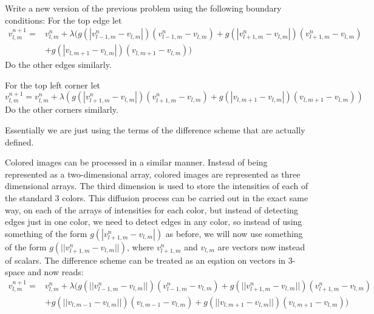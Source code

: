 \begin{problem}
Write a new version of the previous problem using the following boundary conditions:
For the top edge let 
\begin{equation*}
\begin{split}
v_{l,m}^{n+1} =& v_{l,m}^n + \lambda (g(|v_{l-1,m}^n - v_{l,m}|)(v_{l-1,m}^n - v_{l,m}) + g(|v_{l+1,m}^n - v_{l,m}|)(v_{l+1,m}^n - v_{l,m}) \\
 &+ g(|v_{l,m+1} - v_{l,m}|)(v_{l,m+1} - v_{l,m}))
\end{split}
\end{equation*}
Do the other edges similarly.

For the top left corner let
\begin{equation*}
v_{l,m}^{n+1} = v_{l,m}^n + \lambda (g(|v_{l+1,m}^n - v_{l,m}|)(v_{l+1,m}^n - v_{l,m}) + g(|v_{l,m+1} - v_{l,m}|)(v_{l,m+1} - v_{l,m}))
\end{equation*}
Do the other corners similarly.

Essentially we are just using the terms of the difference scheme that are actually defined.
\end{problem}

Colored images can be processed in a similar manner.
Instead of being represented as a two-dimensional array, colored images are represented as three dimensional arrays.
The third dimension is used to store the intensities of each of the standard 3 colors.
This diffusion process can be carried out in the exact same way, on each of the arrays of intensities for each color, but instead of detecting edges just in one color, we need to detect edges in any color, so instead of using something of the form $g(|v_{l+1,m}^n - v_{l,m}|)$ as before, we will now use something of the form $g(||v_{l+1,m}^n - v_{l,m}||)$, where $v_{l+1,m}^n$ and $v_{l,m}$ are vectors now instead of scalars.
The difference scheme can be treated as an eqation on vectors in 3-space and now reads:
\begin{equation*}
\begin{split}
v_{l,m}^{n+1} =& v_{l,m}^n + \lambda (g(||v_{l-1,m}^n - v_{l,m}||)(v_{l-1,m}^n - v_{l,m}) + g(||v_{l+1,m}^n - v_{l,m}||)(v_{l+1,m}^n - v_{l,m}) \\
 &+ g(||v_{l,m-1} - v_{l,m}||)(v_{l,m-1} - v_{l,m}) + g(||v_{l,m+1} - v_{l,m}||)(v_{l,m+1} - v_{l,m}))
\end{split}
\end{equation*}

